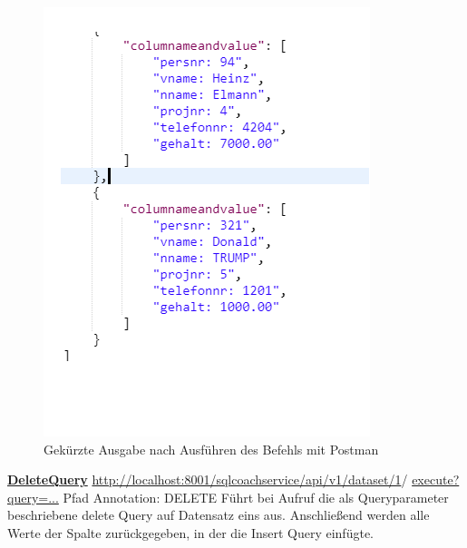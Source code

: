 \documentclass[fleqn,10pt,ngerman]{SelfArx}
\begin{document}
    	 	\begin{figure}[ht]\centering
    	 		\includegraphics[width=9 cm]{Abbildungen/Insert_trump}
    	 		\caption{Gekürzte Ausgabe nach Ausführen des Befehls mit  Postman}
    	 		\label{fig:InsertQ}
    	 	\end{figure}
    	 	\newline\newline
    \noindent
    \underline{\textbf{DeleteQuery}}\newline    
    \underline{http://localhost:8001/sqlcoachservice/api/v1/dataset/1}/\newline
    \underline{execute?query=...}\newline
    Pfad Annotation: DELETE\newline
    Führt bei Aufruf die als Queryparameter beschriebene delete Query auf Datensatz eins aus. 
    Anschließend werden alle Werte der Spalte zurückgegeben, in der die Insert Query einfügte.
\end{document}
